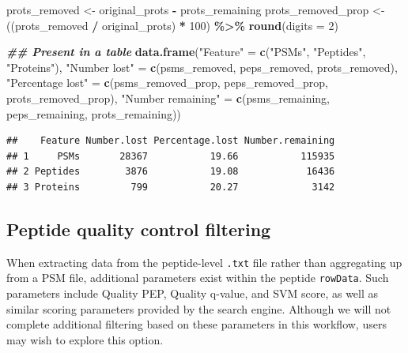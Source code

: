 \documentclass[9pt,a4paper,]{extarticle}
\newenvironment{Shaded}{\begin{snugshade}}{\end{snugshade}}
\newcommand{\AttributeTok}[1]{\textcolor[rgb]{0.13,0.29,0.53}{#1}}
\newcommand{\DecValTok}[1]{\textcolor[rgb]{0.00,0.00,0.81}{#1}}
\newcommand{\DocumentationTok}[1]{\textcolor[rgb]{0.56,0.35,0.01}{\textbf{\textit{#1}}}}
\newcommand{\FunctionTok}[1]{\textcolor[rgb]{0.13,0.29,0.53}{\textbf{#1}}}
\newcommand{\NormalTok}[1]{#1}
\newcommand{\OtherTok}[1]{\textcolor[rgb]{0.56,0.35,0.01}{#1}}
\newcommand{\SpecialCharTok}[1]{\textcolor[rgb]{0.81,0.36,0.00}{\textbf{#1}}}
\newcommand{\StringTok}[1]{\textcolor[rgb]{0.31,0.60,0.02}{#1}}
\begin{document}
\begin{Shaded}
\begin{Highlighting}[]
\NormalTok{prots\_removed }\OtherTok{\textless{}{-}}\NormalTok{ original\_prots }\SpecialCharTok{{-}}\NormalTok{ prots\_remaining}
\NormalTok{prots\_removed\_prop }\OtherTok{\textless{}{-}}\NormalTok{ ((prots\_removed }\SpecialCharTok{/}\NormalTok{ original\_prots) }\SpecialCharTok{*} \DecValTok{100}\NormalTok{) }\SpecialCharTok{\%\textgreater{}\%}
  \FunctionTok{round}\NormalTok{(}\AttributeTok{digits =} \DecValTok{2}\NormalTok{)}

\DocumentationTok{\#\# Present in a table}
\FunctionTok{data.frame}\NormalTok{(}\StringTok{"Feature"} \OtherTok{=} \FunctionTok{c}\NormalTok{(}\StringTok{"PSMs"}\NormalTok{,}
                         \StringTok{"Peptides"}\NormalTok{,}
                         \StringTok{"Proteins"}\NormalTok{),}
           \StringTok{"Number lost"} \OtherTok{=} \FunctionTok{c}\NormalTok{(psms\_removed,}
\NormalTok{                             peps\_removed,}
\NormalTok{                             prots\_removed),}
           \StringTok{"Percentage lost"} \OtherTok{=} \FunctionTok{c}\NormalTok{(psms\_removed\_prop,}
\NormalTok{                                 peps\_removed\_prop,}
\NormalTok{                                 prots\_removed\_prop),}
           \StringTok{"Number remaining"} \OtherTok{=} \FunctionTok{c}\NormalTok{(psms\_remaining,}
\NormalTok{                                  peps\_remaining,}
\NormalTok{                                  prots\_remaining))}
\end{Highlighting}
\end{Shaded}

\begin{verbatim}
##    Feature Number.lost Percentage.lost Number.remaining
## 1     PSMs       28367           19.66           115935
## 2 Peptides        3876           19.08            16436
## 3 Proteins         799           20.27             3142
\end{verbatim}

\subsection{Peptide quality control filtering}\label{peptide-quality-control-filtering}

When extracting data from the peptide-level \texttt{.txt} file rather than aggregating
up from a PSM file, additional parameters exist within the peptide \texttt{rowData}.
Such parameters include Quality PEP, Quality q-value, and SVM score, as well as
similar scoring parameters provided by the search engine. Although we will not
complete additional filtering based on these parameters in this workflow, users
may wish to explore this option.
\end{document}
